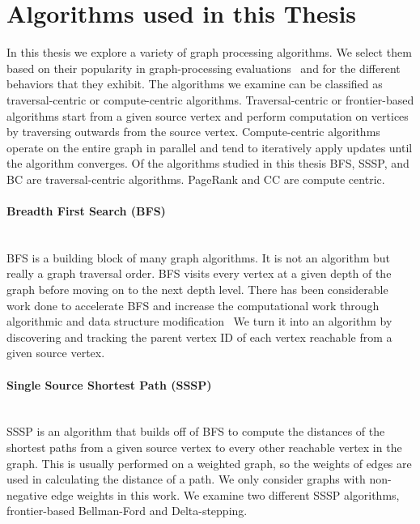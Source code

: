 \section{Algorithms used in this Thesis}\label{thesis:background:algorithms}
In this thesis we explore a variety of graph processing algorithms. 
We select them based on their popularity in graph-processing evaluations~\cite{beamer2016thesis} and for the different behaviors that they exhibit.
The algorithms we examine can be classified as traversal-centric or compute-centric algorithms. 
Traversal-centric or frontier-based algorithms start from a given source vertex and perform computation on vertices by traversing outwards from the source vertex.
Compute-centric algorithms operate on the entire graph in parallel and tend to iteratively apply updates until the algorithm converges.
Of the algorithms studied in this thesis BFS, SSSP, and BC are traversal-centric algorithms.
PageRank and CC are compute centric.

\paragraph{Breadth First Search (BFS)}\mbox{}\\
BFS is a building block of many graph algorithms. 
It is not an algorithm but really a graph traversal order. 
BFS visits every vertex at a given depth of the graph before moving on to the next depth level.
There has been considerable work done to accelerate BFS and increase the computational work through algorithmic and data structure modification~\cite{agarwal2010scalable,beamer-bfs-direction,bulucc2011parallel,hong2011efficient,yoo2005scalable}
We turn it into an algorithm by discovering and tracking the parent vertex ID of each vertex reachable from a given source vertex.

\paragraph{Single Source Shortest Path (SSSP)}\mbox{}\\
SSSP is an algorithm that builds off of BFS to compute the distances of the shortest paths from a given source vertex to every other reachable vertex in the graph.
This is usually performed on a weighted graph, so the weights of edges are used in calculating the distance of a path.
We only consider graphs with non-negative edge weights in this work.
We examine two different SSSP algorithms, frontier-based Bellman-Ford and Delta-stepping.

